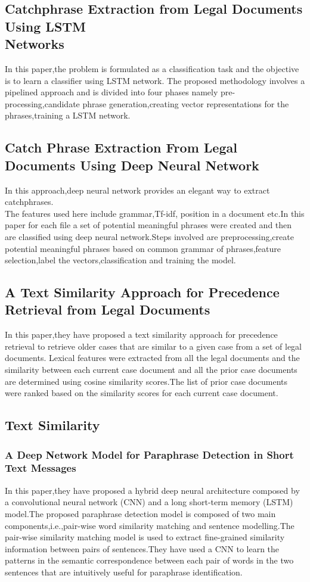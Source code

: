 \documentclass[12pt,a4paper]{article}
\begin{document}
\subsection{Catchphrase Extraction from Legal Documents Using LSTM \\Networks\cite{bhargava2017catchphrase}}
In this paper,the problem is formulated as a classification task and the objective is to learn a classifier using LSTM network. 
The proposed methodology involves a pipelined approach and is divided into four phases namely pre-processing,candidate phrase generation,creating vector representations for the phrases,training a LSTM network.
\subsection{Catch Phrase Extraction From Legal Documents Using Deep Neural Network\cite{das2017catch}}
In this approach,deep neural network provides an elegant way to extract catchphrases.\\The features used here include grammar,Tf-idf, position in a document etc.In this paper for each file a set of potential meaningful phrases were created and then are classified using deep neural network.Steps involved are preprocessing,create potential meaningful phrases based on common grammar of phrases,feature selection,label the vectors,classification and training the model.
\subsection{A Text Similarity Approach for Precedence Retrieval from Legal Documents\cite{thenmozhi2017text}}
In this paper,they have proposed a text similarity approach for precedence retrieval to retrieve older cases that
are similar to a given case from a set of legal documents. Lexical features were extracted from all the legal documents and the similarity between each current case document and all the prior case documents are determined using cosine similarity scores.The list
of prior case documents were ranked based on the similarity scores for each current case document.

\subsection{Text Similarity}
\subsubsection{A Deep Network Model for Paraphrase Detection in Short Text Messages\cite{agarwal2017deep}}
In this paper,they have proposed a hybrid deep neural architecture composed by a convolutional neural network (CNN) and a long short-term memory (LSTM) model.The proposed paraphrase detection model is composed of two main components,i.e.,pair-wise word similarity matching and sentence modelling.The pair-wise similarity matching model is used to extract fine-grained similarity information between pairs of sentences.They have used a CNN to
learn the patterns in the semantic correspondence between each pair of words in the two sentences that
are intuitively useful for paraphrase identification.
\end{document}
